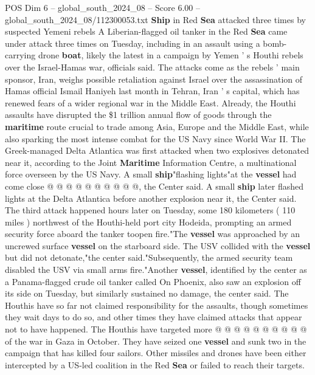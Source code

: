 \begin{textsample}{POS Dim 6 – global\_south\_2024\_08 – Score 6.00 – global\_south\_2024\_08/112300053.txt}  \label{ex:f6_pos_384}
\textbf{Ship} in Red \textbf{Sea} attacked three times by suspected Yemeni rebels A Liberian-flagged oil tanker in the Red \textbf{Sea} came under attack three times on Tuesday, including in an assault using a bomb-carrying drone \textbf{boat}, likely the latest in a campaign by Yemen ' s Houthi rebels over the Israel-Hamas war, officials said.
The attacks come as the rebels ' main sponsor, Iran, weighs possible retaliation against Israel over the assassination of Hamas official Ismail Haniyeh last month in Tehran, Iran ' s capital, which has renewed fears of a wider regional war in the Middle East.
Already, the Houthi assaults have disrupted the \$1 trillion annual flow of goods through the \textbf{maritime} route crucial to trade among Asia, Europe and the Middle East, while also sparking the most intense combat for the US Navy since World War II.
The Greek-managed Delta Atlantica was first attacked when two explosives detonated near it, according to the Joint \textbf{Maritime} Information Centre, a multinational force overseen by the US Navy.
A small \textbf{ship}"flashing lights"at the \textbf{vessel} had come close @ @ @ @ @ @ @ @ @ @, the Center said.
A small \textbf{ship} later flashed lights at the Delta Atlantica before another explosion near it, the Center said.
The third attack happened hours later on Tuesday, some 180 kilometers ( 110 miles ) northwest of the Houthi-held port city Hodeida, prompting an armed security force aboard the tanker toopen fire."The \textbf{vessel} was approached by an uncrewed surface \textbf{vessel} on the starboard side.
The USV collided with the \textbf{vessel} but did not detonate,"the center said."Subsequently, the armed security team disabled the USV via small arms fire."Another \textbf{vessel}, identified by the center as a Panama-flagged crude oil tanker called On Phoenix, also saw an explosion off its side on Tuesday, but similarly sustained no damage, the center said.
The Houthis have so far not claimed responsibility for the assaults, though sometimes they wait days to do so, and other times they have claimed attacks that appear not to have happened.
The Houthis have targeted more @ @ @ @ @ @ @ @ @ @ of the war in Gaza in October.
They have seized one \textbf{vessel} and sunk two in the campaign that has killed four sailors.
Other missiles and drones have been either intercepted by a US-led coalition in the Red \textbf{Sea} or failed to reach their targets.

\end{textsample}
